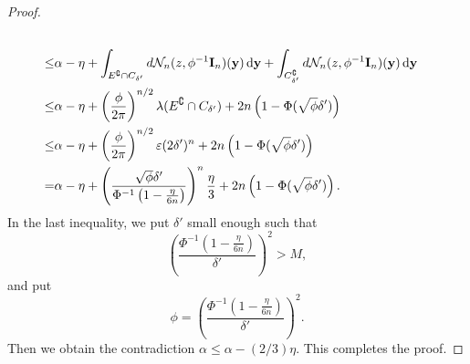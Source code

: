 \documentclass[smallextended]{svjour3}       %
\newcommand{\By}{\mathbf{y}}    \newcommand{\Bz}{\mathbf{z}}
\begin{document}
\begin{proof}
\begin{equation*}
\begin{split}
            \\
            \leq&
            \alpha-\eta
            +
            \int_{E^\complement\cap C_{\delta'}} d\mathcal N_n (z, \phi^{-1} \BI_n) (\By)\,\mathrm{d} \By
            +
            \int_{C_{\delta'}^\complement} d\mathcal N_n (z, \phi^{-1} \BI_n) (\By)\,\mathrm{d} \By
            \\
            \leq&
            \alpha-\eta
            +
            \left(\frac{\phi}{2\pi}\right)^{n/2}\lambda(E^\complement\cap C_{\delta'})
            +
            2n\left(1-\Phi(\sqrt \phi \delta')\right)
            \\
            \leq&
            \alpha-\eta
            +
            \left(\frac{\phi}{2\pi}\right)^{n/2}
            \varepsilon
            (2\delta')^n
            +
            2n\left(1-\Phi(\sqrt \phi \delta')\right)
            \\
            =&
            \alpha-\eta
            +
            \left(\frac{\sqrt{\phi} \delta'}{\Phi^{-1}\left(1-\frac{\eta}{6n}\right)}\right)^{n}
            \frac{\eta}{3}
            +
            2n\left(1-\Phi(\sqrt \phi \delta')\right).
        \end{split}
    \end{equation*}
    In the last inequality, we put $\delta'$ small enough such that
\begin{equation*}
    \left(\frac{\Phi^{-1}\left(1-\frac{\eta}{6n}\right)}{\delta'}\right)^2>M,
\end{equation*}
and put
    \begin{equation*}
        \phi = \left(\frac{\Phi^{-1}\left(1-\frac{\eta}{6n}\right)}{\delta'}\right)^2.
    \end{equation*}
    Then we obtain the contradiction $\alpha\leq \alpha-(2/3)\eta$.
    This completes the proof.

    
\end{proof}
\end{document}
